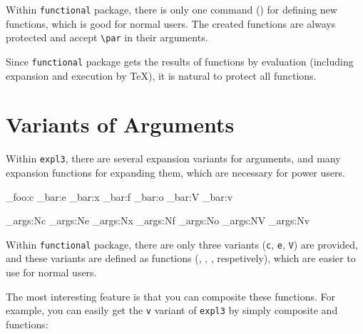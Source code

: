 \documentclass[oneside]{book}
\begin{document}
Within \verb!functional! package, there is only one command ()
for defining new functions, which is good for normal users.
The created functions are always protected and accept \verb!\par! in their arguments.

Since \verb!functional! package gets the results of functions by evaluation
(including expansion and execution by \TeX), it is natural to protect all functions.

\section{Variants of Arguments}

Within \verb!expl3!, there are several expansion variants for arguments,
and many expansion functions for expanding them, which are necessary for power users.

\begin{code}
\module_foo:c
\module_bar:e
\module_bar:x
\module_bar:f
\module_bar:o
\module_bar:V
\module_bar:v
\end{code}

\begin{code}
\exp_args:Nc
\exp_args:Ne
\exp_args:Nx
\exp_args:Nf
\exp_args:No
\exp_args:NV
\exp_args:Nv
\end{code}

Within \verb!functional! package, there are only three variants
(\verb!c!, \verb!e!, \verb!V!) are provided, and these variants are defined
as functions (, , , respetively),
which are easier to use for normal users.

\begin{demohigh}
\newcommand\test{uvw}
\end{demohigh}

\begin{demohigh}
\newcommand\test{uvw}
\Expand{111\test222}
\end{demohigh}

\begin{demohigh}
\IntSet{}
\Value\lTmpaInt
\end{demohigh}

The most interesting feature is that you can composite these functions.
For example, you can easily get the \verb!v! variant of \verb!expl3! by
simply composite  and  functions:

\begin{demohigh}
\IntSet{}
\end{demohigh}
\end{document}

